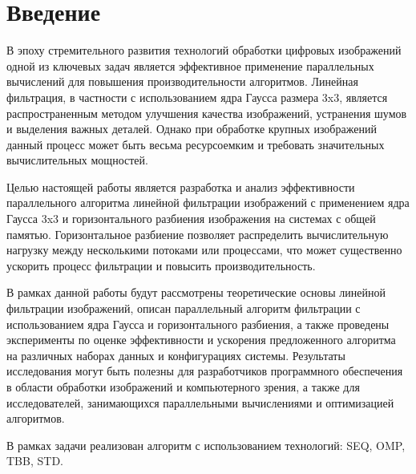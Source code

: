 \documentclass{report}
\begin{document}
\setcounter{page}{2}

\tableofcontents
\newpage

\section*{Введение}
\par В эпоху стремительного развития технологий обработки цифровых изображений одной из ключевых задач является эффективное применение параллельных вычислений для повышения производительности алгоритмов. Линейная фильтрация, в частности с использованием ядра Гаусса размера 3x3, является распространенным методом улучшения качества изображений, устранения шумов и выделения важных деталей. Однако при обработке крупных изображений данный процесс может быть весьма ресурсоемким и требовать значительных вычислительных мощностей.

\par Целью настоящей работы является разработка и анализ эффективности параллельного алгоритма линейной фильтрации изображений с применением ядра Гаусса 3x3 и горизонтального разбиения изображения на системах с общей памятью. Горизонтальное разбиение позволяет распределить вычислительную нагрузку между несколькими потоками или процессами, что может существенно ускорить процесс фильтрации и повысить производительность.

\par В рамках данной работы будут рассмотрены теоретические основы линейной фильтрации изображений, описан параллельный алгоритм фильтрации с использованием ядра Гаусса и горизонтального разбиения, а также проведены эксперименты по оценке эффективности и ускорения предложенного алгоритма на различных наборах данных и конфигурациях системы. Результаты исследования могут быть полезны для разработчиков программного обеспечения в области обработки изображений и компьютерного зрения, а также для исследователей, занимающихся параллельными вычислениями и оптимизацией алгоритмов.

\par В рамках задачи реализован алгоритм с использованием технологий: SEQ, OMP, TBB, STD.

\newpage

\end{document}
